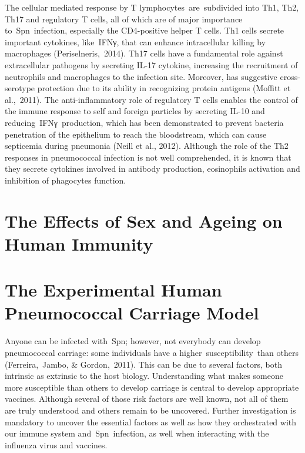 \documentclass[
]{book}
\begin{document}
The cellular mediated response by T lymphocytes~are~subdivided into Th1, Th2, Th17 and regulatory T cells, all of which are of major importance to~Spn~infection, especially the CD4-positive helper T cells. Th1 cells secrete important cytokines, like~IFNγ, that can enhance intracellular killing by macrophages (Periselneris,~2014)⁠. Th17 cells have a fundamental role against extracellular pathogens by secreting IL-17 cytokine, increasing the recruitment of neutrophils and macrophages to the infection site. Moreover, has suggestive cross-serotype protection due to its ability in recognizing protein antigens (Moffitt et al.,~2011)⁠. The anti-inflammatory role of regulatory T cells enables the control of the immune response to self and foreign particles by secreting IL-10 and reducing~IFNγ~production, which has been demonstrated to prevent bacteria penetration of the epithelium to reach the bloodstream, which can cause septicemia during pneumonia (Neill et al., 2012)⁠. Although the role of the Th2 responses in pneumococcal infection is not well comprehended, it is known that they secrete cytokines involved in antibody production, eosinophils activation and inhibition of phagocytes function.

\hypertarget{the-effects-of-sex-and-ageing-on-human-immunity}{%
\section{\texorpdfstring{\textbf{The Effects of Sex and Ageing on Human Immunity}}{The Effects of Sex and Ageing on Human Immunity}}\label{the-effects-of-sex-and-ageing-on-human-immunity}}

\hypertarget{the-experimental-human-pneumococcal-carriage-model}{%
\section{\texorpdfstring{\textbf{The Experimental Human Pneumococcal Carriage Model}}{The Experimental Human Pneumococcal Carriage Model}}\label{the-experimental-human-pneumococcal-carriage-model}}

Anyone can be infected with~Spn; however, not everybody can develop pneumococcal carriage: some individuals have a higher~susceptibility~than others (Ferreira,~Jambo, \& Gordon,~2011)⁠. This can be due to several factors, both intrinsic as extrinsic to the host biology. Understanding what makes someone more susceptible than others to develop carriage is central to develop appropriate vaccines. Although several of those risk factors are well known, not all of them are truly understood and others remain to be uncovered. Further investigation is mandatory to uncover the essential factors as well as how they orchestrated with our immune system and~Spn~infection, as well when interacting with the influenza virus and vaccines.
\end{document}
